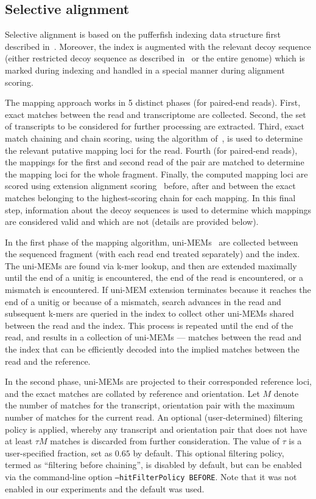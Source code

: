 \subsection{Selective alignment}
\label{subsec:meth_sa}

Selective alignment is based on the pufferfish indexing data structure first
described in~\cite{pufferfish}. Moreover, the index is augmented with the
relevant decoy sequence (either restricted decoy sequence as described
in~ or the entire genome) which is marked during
indexing and handled in a special manner during alignment scoring.


The mapping approach works in 5 distinct phases (for paired-end reads).
First, exact matches between the read and transcriptome are collected.
Second, the set of transcripts to be considered for further processing are
extracted. Third, exact match chaining and chain scoring, using the algorithm
of~\citet{minimap2}, is used to determine the relevant putative mapping loci
for the read. Fourth (for paired-end reads), the mappings for the first and
second read of the pair are matched to determine the mapping loci for the
whole fragment. Finally, the computed mapping loci are scored using extension
alignment scoring~\citep{minimap2,suzuki2018introducing} before, after and 
between the exact matches belonging to the highest-scoring chain for each 
mapping. In this final step, information about the decoy sequences is used to
determine which mappings are considered valid and which are not (details are
provided below).

In the first phase of the mapping algorithm, uni-MEMs~\cite{debga} are
collected between the sequenced fragment (with each read end treated
separately) and the index. The uni-MEMs are found via k-mer lookup, and then
are extended maximally until the end of a unitig is encountered, the
end of the read is encountered, or a mismatch is encountered.  If uni-MEM 
extension terminates because it reaches the end of a unitig or because of a 
mismatch, search advances in the read and subsequent k-mers are queried in 
the index to collect other uni-MEMs shared between the read and the index.
This process is repeated until the end of the read, and results in a collection 
of uni-MEMs --- matches between the read and the index that can be efficiently 
decoded into the implied matches between the read and the reference.

In the second phase, uni-MEMs are projected to their corresponded reference
loci, and the exact matches are collated by reference and orientation. Let
$M$ denote the number of matches for the transcript, orientation pair with
the maximum number of matches for the current read. An optional
(user-determined) filtering policy is applied, whereby any transcript and
orientation pair that does not have at least $\tau M$ matches is
discarded from further consideration. The value of $\tau$ is a user-specified
fraction, set as $0.65$ by default.  This optional filtering policy, termed 
as ``filtering before chaining'', is disabled by default, but can be enabled 
via the command-line option \texttt{--hitFilterPolicy BEFORE}. Note that it
was not enabled in our experiments and the default was used. 

